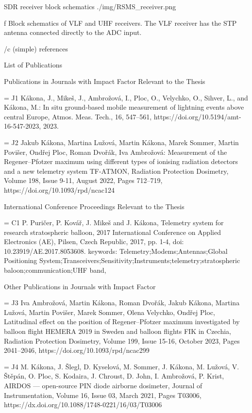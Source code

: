 SDR receiver block schematics
\medskip
\picw=8cm \cinspic ./img/RSMS_receiver.png
\caption/f Block schematics of VLF and UHF receivers. The VLF receiver has the STP antenna connected directly to the ADC input. 
\medskip



\bibchap

\usebib/c (simple) references

\app List of Publications

\specialbibs

\secc Publications in Journals with Impact Factor Relevant to the Thesis
 
\bib[j1] = {J1} Kákona, J., Mikeš, J., Ambrožová, I., Ploc, O., Velychko, O., Sihver, L., and Kákona, M.: In situ ground-based mobile measurement of lightning events above central Europe, Atmos. Meas. Tech., 16, 547–561, https://doi.org/10.5194/amt-16-547-2023, 2023.
 
\bib[j2] = {J2} Jakub Kákona, Martina Lužová, Martin Kákona, Marek Sommer, Martin Povišer, Ondřej Ploc, Roman Dvořák, Iva Ambrožová: Measurement of the Regener–Pfotzer maximum using different types of ionising radiation detectors and a new telemetry system TF-ATMON, Radiation Protection Dosimetry, Volume 198, Issue 9-11, August 2022, Pages 712–719, https://doi.org/10.1093/rpd/ncac124

\secc International Conference Proceedings Relevant to the Thesis

\bib[c1] = {C1} P. Puričer, P. Kovář, J. Mikeš and J. Kákona, Telemetry system for research stratospheric balloon, 2017 International Conference on Applied Electronics (AE), Pilsen, Czech Republic, 2017, pp. 1-4, doi: 10.23919/AE.2017.8053608. keywords: {Telemetry;Modems;Antennas;Global Positioning System;Transceivers;Sensitivity;Instruments;telemetry;stratospheric baloon;communication;UHF band},

\secc Other Publications in Journals with Impact Factor

\bib[j3] = {J3} Iva Ambrožová, Martin Kákona, Roman Dvořák, Jakub Kákona, Martina Lužová, Martin Povišer, Marek Sommer, Olena Velychko, Ondřej Ploc, Latitudinal effect on the position of Regener–Pfotzer maximum investigated by balloon flight HEMERA 2019 in Sweden and balloon flights FIK in Czechia, Radiation Protection Dosimetry, Volume 199, Issue 15-16, October 2023, Pages 2041–2046, https://doi.org/10.1093/rpd/ncac299

\bib[j4] = {J4} M. Kákona, J. Šlegl, D. Kyselová, M. Sommer, J. Kákona, M. Lužová, V. Štěpán, O. Ploc, S. Kodaira, J. Chroust, D. John, I. Ambrožová, P. Krist, AIRDOS — open-source PIN diode airborne dosimeter, Journal of Instrumentation, Volume 16, Issue 03, March 2021, Pages T03006, https://dx.doi.org/10.1088/1748-0221/16/03/T03006


